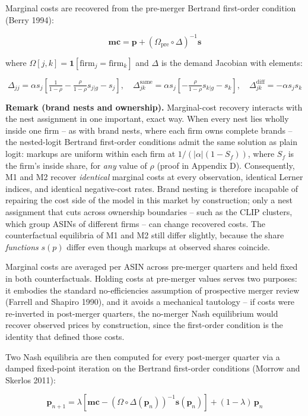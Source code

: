 Marginal costs are recovered from the pre-merger Bertrand first-order
condition (Berry 1994):

\[\mathbf{mc} = \mathbf{p} + (\Omega_{\text{pre}} \circ \Delta)^{-1}\mathbf{s}\]

where \(\Omega[j,k] = \mathbf{1}[\text{firm}_j = \text{firm}_k]\) and
\(\Delta\) is the demand Jacobian with elements:

\[\Delta_{jj} = \alpha s_j\!\left[\tfrac{1}{1-\rho} - \tfrac{\rho}{1-\rho}s_{j|g} - s_j\right], \quad \Delta_{jk}^{\text{same}} = \alpha s_j\!\left[-\tfrac{\rho}{1-\rho}s_{k|g} - s_k\right], \quad \Delta_{jk}^{\text{diff}} = -\alpha s_j s_k\]

\textbf{Remark (brand nests and ownership).} Marginal-cost recovery
interacts with the nest assignment in one important, exact way. When
every nest lies wholly inside one firm -- as with brand nests, where
each firm owns complete brands -- the nested-logit Bertrand first-order
conditions admit the same solution as plain logit: markups are uniform
within each firm at \(1/(|\alpha|(1-S_f))\), where \(S_f\) is the firm's
inside share, for \emph{any} value of \(\rho\) (proof in Appendix D).
Consequently, M1 and M2 recover \emph{identical} marginal costs at every
observation, identical Lerner indices, and identical negative-cost
rates. Brand nesting is therefore incapable of repairing the cost side
of the model in this market by construction; only a nest assignment that
cuts across ownership boundaries -- such as the CLIP clusters, which
group ASINs of different firms -- can change recovered costs. The
counterfactual equilibria of M1 and M2 still differ slightly, because
the share \emph{functions} \(s(p)\) differ even though markups at
observed shares coincide.

Marginal costs are averaged per ASIN across pre-merger quarters and held
fixed in both counterfactuals. Holding costs at pre-merger values serves
two purposes: it embodies the standard no-efficiencies assumption of
prospective merger review (Farrell and Shapiro 1990), and it avoids a
mechanical tautology -- if costs were re-inverted in post-merger
quarters, the no-merger Nash equilibrium would recover observed prices
by construction, since the first-order condition is the identity that
defined those costs.

Two Nash equilibria are then computed for every post-merger quarter via
a damped fixed-point iteration on the Bertrand first-order conditions
(Morrow and Skerlos 2011):

\[\mathbf{p}_{n+1} = \lambda\left[\mathbf{mc} - (\Omega \circ \Delta(\mathbf{p}_n))^{-1}\mathbf{s}(\mathbf{p}_n)\right] + (1-\lambda)\,\mathbf{p}_n\]


